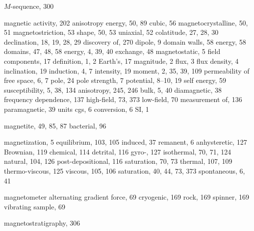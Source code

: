 \documentclass[,plain]{tauxe}
\begin{document}
\begin{theindex}
  \item $M$-sequence, 300
  \item magnetic
    \subitem activity, 202
    \subitem anisotropy energy, 50, 89
      \subsubitem cubic, 56
      \subsubitem magnetocrystalline, 50, 51
      \subsubitem magnetostriction, 53
      \subsubitem shape, 50, 53
      \subsubitem uniaxial, 52
    \subitem colatitude, 27, 28, 30
    \subitem declination, 18, 19, 28, 29
      \subsubitem discovery of, 270
    \subitem dipole, 9
    \subitem domain walls, 58
      \subsubitem energy, 58
    \subitem domains, 47, 48, 58
    \subitem energy, 4, 39, 40
      \subsubitem exchange, 48
      \subsubitem magnetostatic, 5
    \subitem field
      \subsubitem components, 17
      \subsubitem definition, 1, 2
      \subsubitem Earth's, 17
      \subsubitem magnitude, 2
    \subitem flux, 3
    \subitem flux density, 4
    \subitem inclination, 19
    \subitem induction, 4, 7
    \subitem intensity, 19
    \subitem moment, 2, 35, 39, 109
    \subitem permeability of free space, 6, 7
    \subitem pole, 24
    \subitem pole strength, 7
    \subitem potential, 8--10, 19
    \subitem self energy, 59
    \subitem susceptibility, 5, 38, 134
      \subsubitem anisotropy, 245, 246
      \subsubitem bulk, 5, 40
      \subsubitem diamagnetic, 38
      \subsubitem frequency dependence, 137
      \subsubitem high-field, 73, 373
      \subsubitem low-field, 70
      \subsubitem measurement of, 136
      \subsubitem paramagnetic, 39
    \subitem units
      \subsubitem cgs, 6
      \subsubitem conversion, 6
      \subsubitem SI, 1
  \item magnetite, 49, 85, 87
    \subitem bacterial, 96
  \item magnetization, 5
    \subitem equilibrium, 103, 105
    \subitem induced, 37
    \subitem remanent, 6
      \subsubitem anhysteretic, 127
      \subsubitem Brownian, 119
      \subsubitem chemical, 114
      \subsubitem detrital, 116
      \subsubitem gyro-, 127
      \subsubitem isothermal, 70, 71, 124
      \subsubitem natural, 104, 126
      \subsubitem post-depositional, 116
      \subsubitem saturation, 70, 73
      \subsubitem thermal, 107, 109
      \subsubitem thermo-viscous, 125
      \subsubitem viscous, 105, 106
    \subitem saturation, 40, 44, 73, 373
    \subitem spontaneous, 6, 41
  \item magnetometer
    \subitem alternating gradient force, 69
    \subitem cryogenic, 169
    \subitem rock, 169
    \subitem spinner, 169
    \subitem vibrating sample, 69
  \item magnetostratigraphy, 306

\end{theindex}
\end{document}
